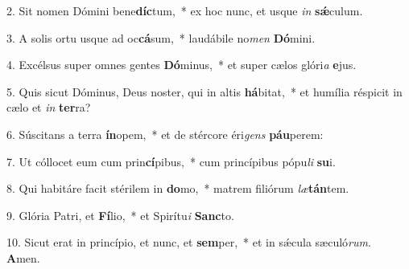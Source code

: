 2. Sit nomen Dómini bene\textbf{díc}tum,~*  ex hoc nunc, et usque \textit{in} \textbf{sǽ}culum.\

3. A solis ortu usque ad oc\textbf{cá}sum,~*  laudábile no\textit{men} \textbf{Dó}mini.\

4. Excélsus super omnes gentes \textbf{Dó}minus,~*  et super cælos glóri\textit{a} \textbf{e}jus.\

5. Quis sicut Dóminus, Deus noster, qui in altis \textbf{há}bitat,~*  et humília réspicit in cælo et \textit{in} \textbf{ter}ra?\

6. Súscitans a terra \textbf{ín}opem,~*  et de stércore éri\textit{gens} \textbf{páu}perem:\

7. Ut cóllocet eum cum prin\textbf{cí}pibus,~*  cum princípibus pópu\textit{li} \textbf{su}i.\

8. Qui habitáre facit stérilem in \textbf{do}mo,~*  matrem filiórum \textit{læ}\textbf{tán}tem.\

9. Glória Patri, et \textbf{Fí}lio,~*  et Spirítu\textit{i} \textbf{Sanc}to.\

10. Sicut erat in princípio, et nunc, et \textbf{sem}per,~*  et in sǽcula sæculó\textit{rum}. \textbf{A}men.\

